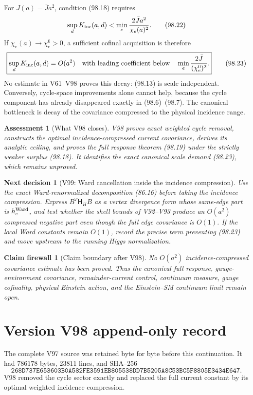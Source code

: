 \documentclass[11pt]{article}
\newtheorem{firewall}[theorem]{Claim firewall}
\newtheorem{decision}[theorem]{Next decision}
\newtheorem{assessment}[theorem]{Assessment}
\theoremstyle{remark}
\begin{document}
For \(J(a)=\bar Ja^2\), condition (98.18) requires
\[
 \sup_dK_{\rm inc}(a,d)
 <\min_e\frac{2\bar Ja^2}{\chi_e(a)^2}.             \tag{98.22}
\]
If \(\chi_e(a)\to\chi_e^0>0\), a sufficient cofinal acquisition is
therefore
\[
\boxed{
 \sup_dK_{\rm inc}(a,d)=O(a^2)
 \quad\text{with leading coefficient below}
 \quad\min_e\frac{2\bar J}{(\chi_e^0)^2}.}          \tag{98.23}
\]
No estimate in V61--V98 proves this decay: (98.13) is scale
independent.  Conversely, cycle-space improvements alone cannot help,
because the cycle component has already disappeared exactly in
(98.6)--(98.7).  The canonical bottleneck is decay of the covariance
compressed to the physical incidence range.

\begin{assessment}[What V98 closes]
\label{ass:v17v98-status}
V98 proves exact weighted cycle removal, constructs the optimal
incidence-compressed current covariance, derives its analytic ceiling,
and proves the full response theorem (98.19) under the strictly weaker
surplus (98.18).  It identifies the exact canonical scale demand
(98.23), which remains unproved.
\end{assessment}

\begin{decision}[V99: Ward cancellation inside the incidence compression]
\label{dec:v17v98-next}
Use the exact Ward-renormalized decomposition (86.16) before taking the
incidence compression.  Express
\(B^T\mathsf H_HB\) as a vertex divergence form whose same-edge part is
\(h_e^{\rm Ward}\), and test whether the shell bounds of V92--V93
produce an \(O(a^2)\) compressed negative part even though the full
edge covariance is \(O(1)\).  If the local Ward constants remain
\(O(1)\), record the precise term preventing (98.23) and move upstream
to the running Higgs normalization.
\end{decision}

\begin{firewall}[Claim boundary after V98]
\label{fire:v17v98}
No \(O(a^2)\) incidence-compressed covariance estimate has been
proved.  Thus the canonical full response, gauge-environment
covariance, remainder-current control, continuum measure, gauge
cofinality, physical Einstein action, and the Einstein--SM continuum
limit remain open.
\end{firewall}

\section*{Version V98 append-only record}
The complete V97 source was retained byte for byte before this
continuation.  It had \(786178\) bytes, \(23811\) lines, and SHA--256
\[
 \texttt{268D737E653603B0A582FE3591EB805538DD7B5205A8C53BC5F8805E3434E647}.
\]
V98 removed the cycle sector exactly and replaced the full current
constant by its optimal weighted incidence compression.
\end{document}
